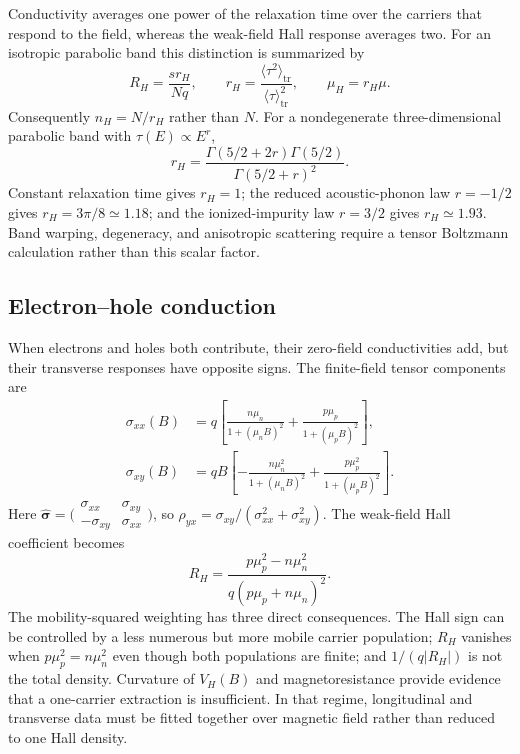 Conductivity averages one power of the relaxation time over the carriers that
respond to the field, whereas the weak-field Hall response averages two.  For
an isotropic parabolic band this distinction is summarized by
\begin{equation}
  R_H=\frac{s r_H}{Nq},
  \qquad
  r_H=\frac{\langle\tau^2\rangle_{\mathrm{tr}}}
  {\langle\tau\rangle_{\mathrm{tr}}^2},
  \qquad
  \mu_H=r_H\mu.
  \label{eq:transport-hall-factor}
\end{equation}
Consequently $n_H=N/r_H$ rather than $N$.  For a nondegenerate three-dimensional
parabolic band with $\tau(E)\propto E^r$,
\begin{equation}
  r_H=
  \frac{\Gamma(5/2+2r)\Gamma(5/2)}{\Gamma(5/2+r)^2}.
  \label{eq:transport-hall-factor-power-law}
\end{equation}
Constant relaxation time gives $r_H=1$; the reduced acoustic-phonon law
$r=-1/2$ gives $r_H=3\pi/8\simeq1.18$; and the ionized-impurity law $r=3/2$
gives $r_H\simeq1.93$.  Band warping, degeneracy, and anisotropic scattering
require a tensor Boltzmann calculation rather than this scalar factor.

\subsection{Electron--hole conduction}

When electrons and holes both contribute, their zero-field conductivities add,
but their transverse responses have opposite signs.  The finite-field tensor
components are
\begin{align}
  \sigma_{xx}(B)
  &=q\left[
  \frac{n\mu_n}{1+(\mu_nB)^2}
  +\frac{p\mu_p}{1+(\mu_pB)^2}
  \right],\\
  \sigma_{xy}(B)
  &=qB\left[
  -\frac{n\mu_n^2}{1+(\mu_nB)^2}
  +\frac{p\mu_p^2}{1+(\mu_pB)^2}
  \right].
  \label{eq:transport-two-carrier-conductivity}
\end{align}
Here
$\hat{\bm\sigma}=\bigl(\begin{smallmatrix}\sigma_{xx}&\sigma_{xy}\\
-\sigma_{xy}&\sigma_{xx}\end{smallmatrix}\bigr)$, so
$\rho_{yx}=\sigma_{xy}/(\sigma_{xx}^2+\sigma_{xy}^2)$.  The weak-field Hall
coefficient becomes
\begin{equation}
  \boxed{
  R_H=
  \frac{p\mu_p^2-n\mu_n^2}
  {q\left(p\mu_p+n\mu_n\right)^2}.}
  \label{eq:transport-two-carrier-hall}
\end{equation}
The mobility-squared weighting has three direct consequences.  The Hall sign
can be controlled by a less numerous but more mobile carrier population;
$R_H$ vanishes when $p\mu_p^2=n\mu_n^2$ even though both populations are
finite; and $1/(q|R_H|)$ is not the total density.  Curvature of $V_H(B)$ and
magnetoresistance provide evidence that a one-carrier extraction is
insufficient.  In that regime, longitudinal and transverse data must be fitted
together over magnetic field rather than reduced to one Hall density.

